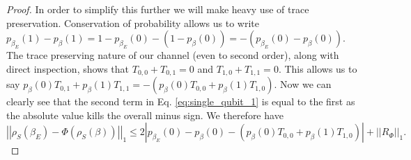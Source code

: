 \documentclass{article}
\newcommand{\norm}[1]{\left| \left| #1 \right| \right|}
\begin{document}
\begin{proof}
In order to simplify this further we will make heavy use of trace preservation. Conservation of probability allows us to write $p_{\beta_E}(1) - p_{\beta}(1) = 1 - p_{\beta_E}(0) - (1 - p_{\beta}(0)) = -(p_{\beta_E}(0) - p_{\beta}(0))$. The trace preserving nature of our channel (even to second order), along with direct inspection, shows that $T_{0, 0} + T_{0, 1} = 0$ and $T_{1, 0} + T_{1, 1} = 0$. This allows us to say $p_{\beta}(0) T_{0, 1} + p_{\beta}(1) T_{1, 1} = -(p_{\beta}(0) T_{0, 0} + p_{\beta}(1) T_{1, 0})$. Now we can clearly see that the second term in Eq. \eqref{eq:single_qubit_1} is equal to the first as the absolute value kills the overall minus sign. We therefore have 
\begin{equation}
    \norm{\rho_S(\beta_E) - \Phi(\rho_S(\beta))}_1 \le 2 \left|p_{\beta_E}(0) - p_{\beta}(0) - (p_{\beta}(0) T_{0,0} + p_{\beta}(1) T_{1, 0}) \right| + \norm{R_{\Phi}}_1. \label{eq:single_qubit_2}
 \end{equation}


\end{proof}
\end{document}
